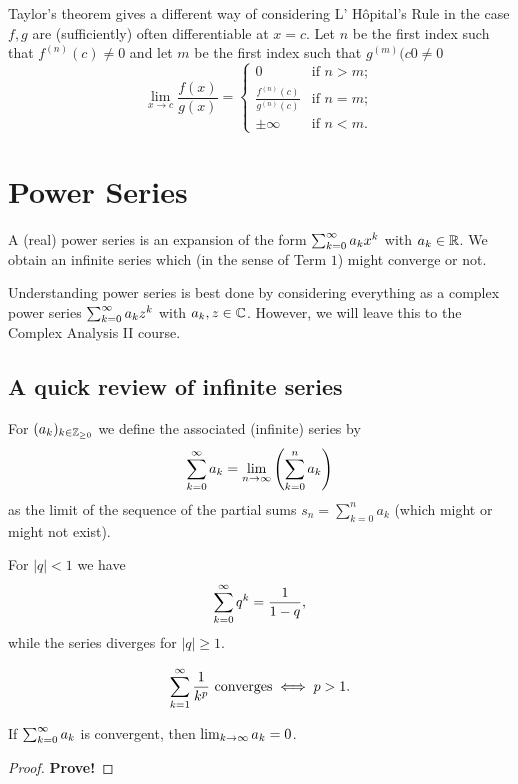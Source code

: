 \documentclass[10pt, a4paper]{article}
\newcommand{\lhopital}[0]{L' H\^opital}
\begin{document}
\begin{remark}
    Taylor's theorem gives a different way of considering \lhopital's Rule in the case $f, g$ are
    (sufficiently)
    often differentiable at $x = c$.
    Let $n$ be the first index such that $f ^ {(n)}(c) \neq 0$ and let $m$ be the first index such that $g ^ {(m)}(c0 \neq 0$
    \[
    \lim_{x \rightarrow c}\frac{f(x)}{g(x)} = \begin{cases}
        0 & \text{if } n > m; \\
        \frac{f ^ {(n)}(c)}{g ^ {(n)}(c)} & \text{if } n = m; \\
        \pm\infty & \text{if } n < m.
    \end{cases}
    \]
\end{remark}

\newpage

\section{Power Series}
A
(real)
power series is an expansion of the form $\infsum[k = 0]a_kx ^ k$ with $a_k \in \R$.
We obtain an infinite series which
(in the sense of Term $1$)
might converge or not.

Understanding power series is best done by considering everything as a complex power series $\infsum[k = 0]a_kz ^ k$ with $a_k, z \in \C$.
However,
we will leave this to the Complex Analysis II course.

\subsection{A quick review of infinite series}

For $(a_k)_{k \in \Z_{\geq 0}}$ we define the associated
(infinite)
series by
\[
\infsum[k = 0]a_k = \liminfty[n]\left(\sum_{k = 0}^{n}a_k\right)
\]
as the limit of the sequence of the partial sums $s_n = \sum_{k = 0}^{n}a_k$
(which might or might not exist).
\begin{example}
    For $|q| < 1$ we have
    \[
    \infsum[k = 0]q ^ k = \frac{1}{1 - q},
    \]
    while the series diverges for $|q| \geq 1$.
\end{example}

\begin{example}[$p$-series]
    \[
    \infsum\frac{1}{k ^ p}\text{ converges} \iff p > 1.
    \]
\end{example}

\begin{lemma}
    If $\infsum[k = 0]a_k$ is convergent,
    then $\liminfty[k]a_k = 0$.
    \begin{proof}
        \textbf{Prove!}
    \end{proof}
\end{lemma}
\end{document}
